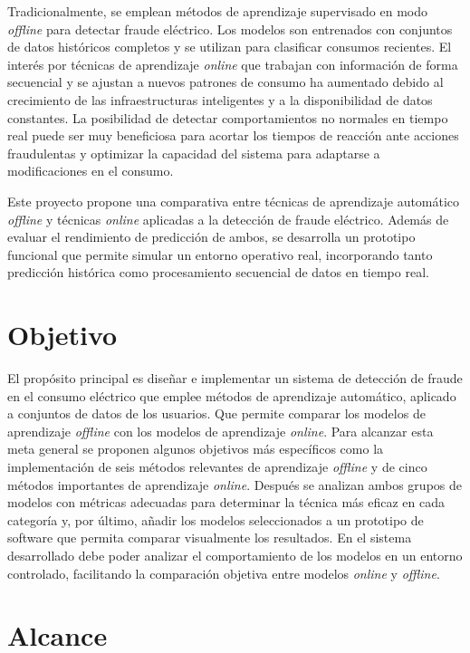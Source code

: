 \documentclass[12pt,a4paper]{report}
\begin{document}
Tradicionalmente, se emplean métodos de aprendizaje supervisado en modo \emph{offline} para detectar fraude eléctrico. Los modelos son entrenados con conjuntos de datos históricos completos y se utilizan para clasificar consumos recientes. El interés por técnicas de aprendizaje \emph{online} que trabajan con información de forma secuencial y se ajustan a nuevos patrones de consumo ha aumentado debido al crecimiento de las infraestructuras inteligentes y a la disponibilidad de datos constantes. La posibilidad de detectar comportamientos no normales en tiempo real puede ser muy beneficiosa para acortar los tiempos de reacción ante acciones fraudulentas y optimizar la capacidad del sistema para adaptarse a modificaciones en el consumo.

Este proyecto propone una comparativa entre técnicas de aprendizaje automático \emph{offline} y técnicas \emph{online} aplicadas a la detección de fraude eléctrico. Además de evaluar el rendimiento de predicción de ambos, se desarrolla un prototipo funcional que permite simular un entorno operativo real, incorporando tanto predicción histórica como procesamiento secuencial de datos en tiempo real.


\section{Objetivo}

El propósito principal es diseñar e implementar un sistema de detección de fraude en el consumo eléctrico que emplee métodos de aprendizaje automático, aplicado a conjuntos de datos de los usuarios. Que permite comparar los modelos de aprendizaje \emph{offline} con los modelos de aprendizaje \emph{online}. Para alcanzar esta meta general se proponen algunos objetivos más específicos como la implementación de seis métodos relevantes de aprendizaje \emph{offline} y de cinco métodos importantes de aprendizaje \emph{online}. Después se analizan ambos grupos de modelos con métricas adecuadas para determinar la técnica más eficaz en cada categoría y, por último, añadir los modelos seleccionados a un prototipo de software que permita comparar visualmente los resultados. En el sistema desarrollado debe poder analizar el comportamiento de los modelos en un entorno controlado, facilitando la comparación objetiva entre modelos \emph{online} y \emph{offline}.


\section{Alcance}
\end{document}
